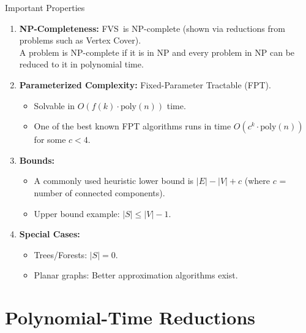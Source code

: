 \documentclass[aspectratio=169]{beamer}
\newcommand{\fvs}{\textsc{FVS}}
\newcommand{\np}{\textsc{NP}}
\begin{document}
\begin{frame}{Important Properties}
\begin{enumerate}
	\item<1-> \textbf{NP-Completeness:} \fvs\ is \np-complete (shown via reductions from problems such as Vertex Cover).\\
				\small A problem is NP-complete if it is in NP and every problem in NP can be reduced to it in polynomial time.

	\item<2-> \textbf{Parameterized Complexity:} Fixed-Parameter Tractable (FPT).
				\begin{itemize}
					\item<3-> Solvable in $O(f(k)\cdot\mathrm{poly}(n))$ time.
					\item<3-> One of the best known FPT algorithms runs in time $O(c^k\cdot\mathrm{poly}(n))$ for some $c<4$.
				\end{itemize}

	\item<4-> \textbf{Bounds:}
				\begin{itemize}
					\item<4-> A commonly used heuristic lower bound is $|E| - |V| + c$ (where $c$ = number of connected components).
					\item<4-> Upper bound example: $|S| \leq |V| - 1$.
				\end{itemize}

	\item<5-> \textbf{Special Cases:}
				\begin{itemize}
					\item<5-> Trees/Forests: $|S| = 0$.
					\item<5-> Planar graphs: Better approximation algorithms exist.
				\end{itemize}
\end{enumerate}
\end{frame}







\section{Polynomial-Time Reductions}
\end{document}
